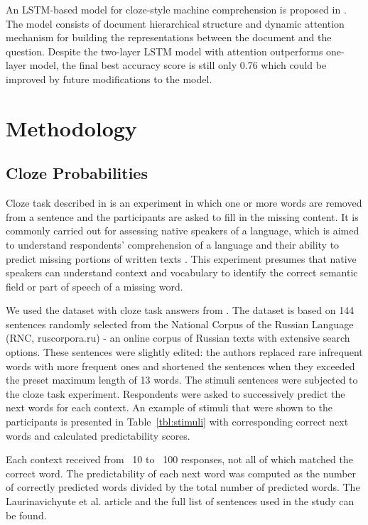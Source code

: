 \documentclass[a4paper]{article}
\begin{document}
An LSTM-based model for cloze-style machine comprehension is proposed in \cite{wang-cloze}. The model consists of document hierarchical structure and dynamic attention mechanism for building the representations between the document and the question. Despite the two-layer LSTM model with attention outperforms one-layer model, the final best accuracy score is still only 0.76 which could be improved by future modifications to the model.


\section{Methodology}

\subsection{Cloze Probabilities}

Cloze task described in \cite{taylor:1953} is an experiment in which one or more words are removed from a sentence and the participants are asked to fill in the missing content. It is commonly carried out for assessing native speakers of a language, which is aimed to understand respondents’ comprehension of a language and their ability to predict missing portions of written texts \cite{laurinavichyute}. This experiment presumes that native speakers can understand context and vocabulary to identify the correct semantic field or part of speech of a missing word.

We used the dataset with cloze task answers from \cite{laurinavichyute}. The dataset is based on 144 sentences randomly selected from the National Corpus of the Russian Language (RNC, ruscorpora.ru) - an online corpus of Russian texts with extensive search options. These sentences were slightly edited: the authors replaced rare infrequent words with more frequent ones and shortened the sentences when they exceeded the preset maximum length of 13 words. The stimuli sentences were subjected to the cloze task experiment. Respondents were asked to successively predict the next words for each context. An example of stimuli that were shown to the participants is presented in Table~\ref{tbl:stimuli} with corresponding correct next words and calculated predictability scores.

Each context received from ~10 to ~100 responses, not all of which matched the correct word. The predictability of each next word was computed as the number of correctly predicted words divided by the total number of predicted words. The Laurinavichyute et al. article and the full list of sentences used in the study can be found. 
\end{document}
